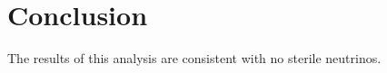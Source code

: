 \chapter{Conclusion}
\label{conclusion}

The results of this analysis are consistent with no sterile neutrinos.